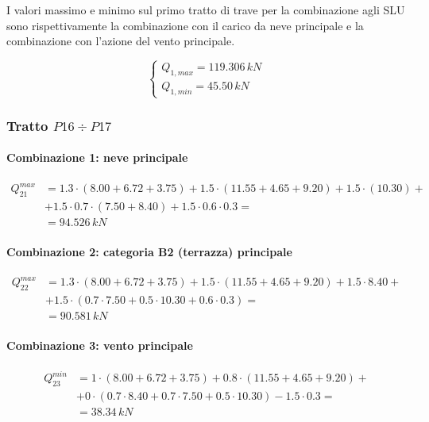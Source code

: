 I valori massimo e minimo sul primo tratto di trave per la combinazione agli SLU sono rispettivamente la combinazione con il carico da neve principale e la combinazione con l'azione del vento principale.

\begin{equation}
		\label{eq:Q1maxmin_slu}
		\begin{cases}
			Q_{1,max} = 119.306\,kN\\
			Q_{1, min} = 45.50\,kN
		\end{cases}
\end{equation}

\subsubsection*{Tratto $P16\div P17$}

\paragraph{Combinazione 1: neve principale}

\begin{align*}
	Q_{21}^{max} &= 1.3\cdot(8.00 +6.72 + 3.75) + 1.5\cdot(11.55+4.65 + 9.20) + 1.5\cdot(10.30)+\\
	&+ 1.5\cdot0.7\cdot(7.50+8.40) + 1.5\cdot0.6\cdot0.3 =\\
	&= 	94.526\,kN
\end{align*}

\paragraph{Combinazione 2: categoria B2 (terrazza) principale}

\begin{align*}
	Q_{22}^{max} &= 1.3\cdot(8.00 +6.72 + 3.75) + 1.5\cdot(11.55+4.65 + 9.20) + 1.5\cdot8.40+\\
	&+ 1.5\cdot(0.7\cdot7.50+ 0.5\cdot 10.30 + 0.6\cdot0.3) =\\
	&= 	90.581\,kN
\end{align*}

\paragraph{Combinazione 3: vento principale}

\begin{align*}
	Q_{23}^{min} &= 1\cdot(8.00 +6.72 + 3.75) + 0.8\cdot(11.55+4.65 + 9.20) +\\
	&+ 0\cdot(0.7\cdot 8.40 + 0.7\cdot7.50+ 0.5\cdot 10.30) -1.5\cdot0.3 =\\
	&= 	38.34\,kN
\end{align*}

